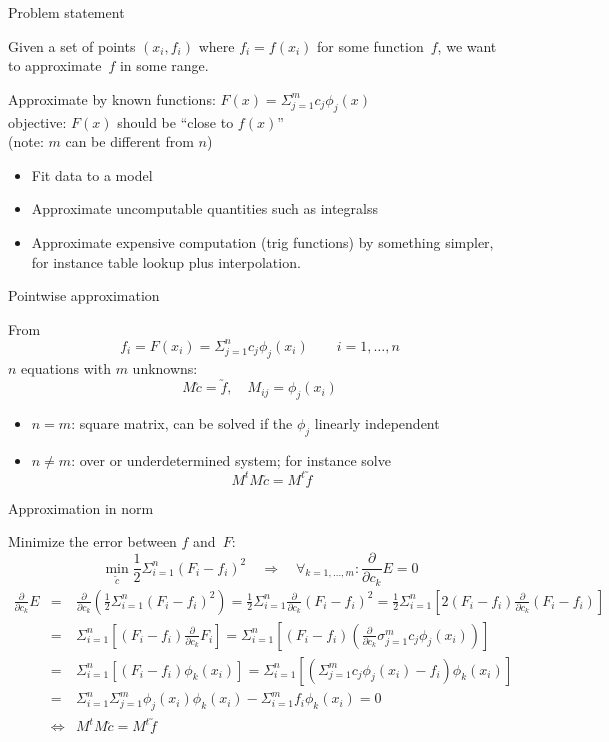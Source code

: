 {Problem statement} 

  Given a set of points $(x_i,f_i)$ where $f_i=f(x_i)$ for some
  function~$f$, we want to approximate~$f$ in some range.

  Approximate by known functions: $F(x)=\Sigma_{j=1}^mc_j\phi_j(x)$\\
  objective: $F(x)$ should be ``close to $f(x)$''\\
  (note: $m$ can be different from $n$)

  \begin{itemize}
  \item Fit data to a model
  \item Approximate uncomputable quantities such as integralss
  \item Approximate expensive computation (trig functions) by
    something simpler, for instance table lookup plus interpolation.
  \end{itemize}

 {Pointwise approximation}

  From \[ f_i=F(x_i)=\Sigma_{j=1}^nc_j\phi_j(x_i) \qquad i=1,\ldots,n \]
  $n$ equations with $m$ unknowns:
  \[ M \utilde c = \utilde f,\quad M_{ij}=\phi_j(x_i) \]

  \begin{itemize}
  \item $n=m$: square matrix, can be solved if the $\phi_j$ linearly independent
  \item $n\not=m$: over or underdetermined system; for instance solve
    \[ M^tM \utilde c = M^t \utilde f \]
  \end{itemize}

 {Approximation in norm}

  Minimize the error between $f$ and~$F$:
  \[ \min_{\utilde c} \frac12 \Sigma_{i=1}^n (F_i-f_i)^2 \quad\Rightarrow\quad
  \forall_{k=1,\ldots,m}\colon \frac\partial{\partial c_k}E=0
  \]
  \def\pck{\frac\partial{\partial c_k}}
  \begin{eqnarray*}
    \pck E&=&\pck \left(\frac12\Sigma_{i=1}^n(F_i-f_i)^2\right)
    = \frac12 \Sigma_{i=1}^n \pck (F_i-f_i)^2
    = \frac12 \Sigma_{i=1}^n \left[2(F_i-f_i)\pck (F_i-f_i)\right ]\\
    &=&\Sigma_{i=1}^n\left[(F_i-f_i)\pck F_i\right]
    = \Sigma_{i=1}^n\left[ (F_i-f_i)\left(
        \pck \sigma_{j=1}^m c_j\phi_j(x_i) \right) \right ]\\
    &=& \Sigma_{i=1}^n[(F_i-f_i)\phi_k(x_i)]
    = \Sigma_{i=1}^n\left[ \left( \Sigma_{j=1}^m c_j\phi_j(x_i)-f_i \right)
      \phi_k(x_i) \right]\\
    &=& \Sigma_{i=1}^n\Sigma_{j=1}^m \phi_j(x_i)\phi_k(x_i)
    - \Sigma_{i=1}^m f_i\phi_k(x_i) = 0\\
    &\Leftrightarrow&M^tM\utilde c=M^t\utilde f
  \end{eqnarray*}

